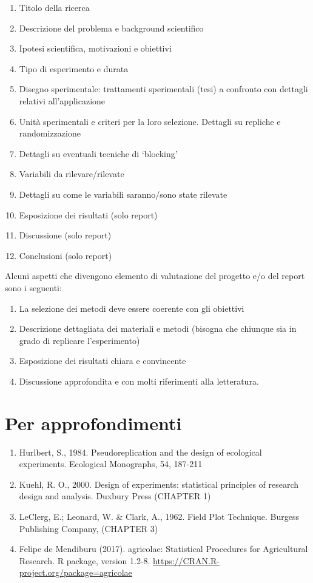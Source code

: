 \documentclass[a4paper,12pt,oneside]{book}
\providecommand{\tightlist}{%
  \setlength{\itemsep}{0pt}\setlength{\parskip}{0pt}}
\begin{document}
\begin{enumerate}
\def\labelenumi{\arabic{enumi}.}
\tightlist
\item
  Titolo della ricerca
\item
  Descrizione del problema e background scientifico
\item
  Ipotesi scientifica, motivazioni e obiettivi
\item
  Tipo di esperimento e durata
\item
  Disegno sperimentale: trattamenti sperimentali (tesi) a confronto con
  dettagli relativi all'applicazione
\item
  Unità sperimentali e criteri per la loro selezione. Dettagli su
  repliche e randomizzazione
\item
  Dettagli su eventuali tecniche di `blocking'
\item
  Variabili da rilevare/rilevate
\item
  Dettagli su come le variabili saranno/sono state rilevate
\item
  Esposizione dei risultati (solo report)
\item
  Discussione (solo report)
\item
  Conclusioni (solo report)
\end{enumerate}

Alcuni aspetti che divengono elemento di valutazione del progetto e/o
del report sono i seguenti:

\begin{enumerate}
\def\labelenumi{\arabic{enumi}.}
\tightlist
\item
  La selezione dei metodi deve essere coerente con gli obiettivi
\item
  Descrizione dettagliata dei materiali e metodi (bisogna che chiunque
  sia in grado di replicare l'esperimento)
\item
  Esposizione dei risultati chiara e convincente
\item
  Discussione approfondita e con molti riferimenti alla letteratura.
\end{enumerate}

\section{Per approfondimenti}\label{per-approfondimenti}

\begin{enumerate}
\def\labelenumi{\arabic{enumi}.}
\tightlist
\item
  Hurlbert, S., 1984. Pseudoreplication and the design of ecological
  experiments. Ecological Monographs, 54, 187-211
\item
  Kuehl, R. O., 2000. Design of experiments: statistical principles of
  research design and analysis. Duxbury Press (CHAPTER 1)
\item
  LeClerg, E.; Leonard, W. \& Clark, A., 1962. Field Plot Technique.
  Burgess Publishing Company, (CHAPTER 3)
\item
  Felipe de Mendiburu (2017). agricolae: Statistical Procedures for
  Agricultural Research. R package, version 1.2-8.
  \url{https://CRAN.R-project.org/package=agricolae}
\end{enumerate}
\end{document}
